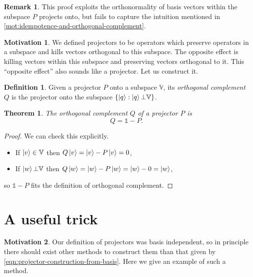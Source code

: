 \documentclass{article}
\theoremstyle{definition}
\newtheorem{mot}{Motivation}[section]
\newtheorem{rem}{Remark}[section]
\newtheorem{dfn}{Definition}[section]
\theoremstyle{plain}
\newtheorem{thm}{Theorem}[section]
\numberwithin{equation}{section}
\begin{document}
\begin{rem}
    This proof exploits the orthonormality of 
    basis vectors within the subspace $P$ 
    projects onto, but fails to capture the 
    intuition mentioned in 
    \cref{mot:idempotence-and-orthogonal-complement}. 
\end{rem}

\begin{mot}
    We defined projectors to be operators which 
    preserve operators in a subspace and kills 
    vectors orthogonal to this subspace. The 
    opposite effect is killing vectors within 
    this subspace and preserving vectors orthogonal 
    to it. This ``opposite effect'' also sounds like 
    a projector. Let us construct it. 
\end{mot}

\begin{dfn}
    Given a projector $P$ onto a subspace $\mathbb{V}$, 
    its \emph{orthogonal complement} $Q$ is 
    the projector onto the subspace 
    $\{\ket{q}: \ket{q} \bot \mathbb{V}\}$. 
\end{dfn}

\begin{thm}
    The orthogonal complement $Q$ of a projector 
    $P$ is 
    \begin{equation}
        Q=\mathds{1} - P.
    \end{equation}
\end{thm}

\begin{proof}
    We can check this explicitly. 
    \begin{itemize}
        \item 
        If $\ket{v} \in \mathbb{V}$ then 
        $Q \ket{v} = \ket{v}-P \ket{v} = 0$, 
        \item 
        If $\ket{w} \bot \mathbb{V}$ then 
        $Q \ket{w} = \ket{w} - P \ket{w} 
        = \ket{w} - 0 = \ket{w}$,
    \end{itemize}
    so $\mathds{1} - P$ fits the definition of 
    orthogonal complement.
\end{proof}

\section{A useful trick}
\label{sec:a-useful-trick}

\begin{mot}
    Our definition of projectors was basis independent, 
    so in principle there should exist other methods to 
    construct them than that given by 
    \cref{eqn:projector-construction-from-basis}. 
    Here we give an example of such a method.
\end{mot}
\end{document}

